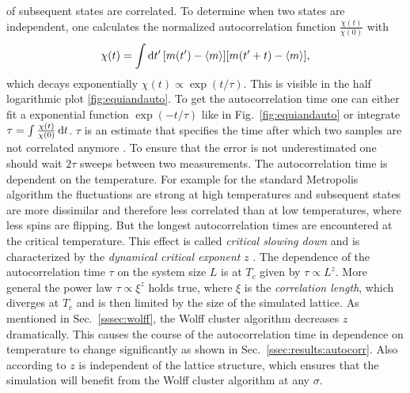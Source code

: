         of subsequent states are correlated. To determine when two states
        are independent, one calculates the normalized autocorrelation function
        \(\frac{\chi(t)}{\chi(0)}\) with
        \begin{equation}
            \chi(t) = \int \mathrm{d} t' \, [m(t') -\left< m \right>][m(t'+t)-\left< m \right>],
        \end{equation}
        which decays exponentially
        \(\chi(t) \propto \exp(t/\tau)\). This is visible in the half
        logarithmic plot \ref{fig:equiandauto}.
        To get the autocorrelation time one can either fit a exponential
        function \(\exp(-t/\tau)\) like in Fig.\ \ref{fig:equiandauto}
        or integrate \(\tau = \int \frac{\chi(t)}{\chi(0)} \,\mathrm{d} t\).
        \(\tau\) is an estimate that specifies the time after which two
        samples are not correlated anymore \cite[p. 59ff]{NewmanBarkema1999} \cite[p. 150f]{Katzgraber2011}.
        To ensure that the error is not underestimated one should wait
        \(2\tau\) sweeps between two measurements.
        The autocorrelation time is dependent on the temperature.
        For example for the standard Metropolis algorithm the fluctuations
        are strong at high temperatures and subsequent
        states are more dissimilar and therefore less correlated than at low
        temperatures, where less spins are flipping. But the longest
        autocorrelation times are encountered at the critical temperature.
        This effect is called \emph{critical slowing down} and is
        characterized by the \emph{dynamical critical exponent} \(z\)
        \cite{SwendsenWang1987}. The dependence of the autocorrelation time
        \(\tau\) on the system size \(L\) is at \(T_{c}\) given by \(\tau \propto L^z\).
        More general the power law \(\tau \propto \xi^z\) holds true, where
        \(\xi\) is the \emph{correlation length}, which diverges at
        \(T_{c}\) and is then limited by the size of the simulated lattice.
        As mentioned in Sec.\ \ref{sssec:wolff}, the Wolff cluster algorithm
        decreases \(z\) dramatically. This causes the course of the autocorrelation
        time in dependence on temperature to change significantly as shown in
        Sec.\ \ref{ssec:results:autocorr}. Also according to \cite{NewmanBarkema1999}
        \(z\) is independent of the lattice structure, which ensures that
        the simulation will benefit from the Wolff cluster algorithm at
        any \(\sigma\).
